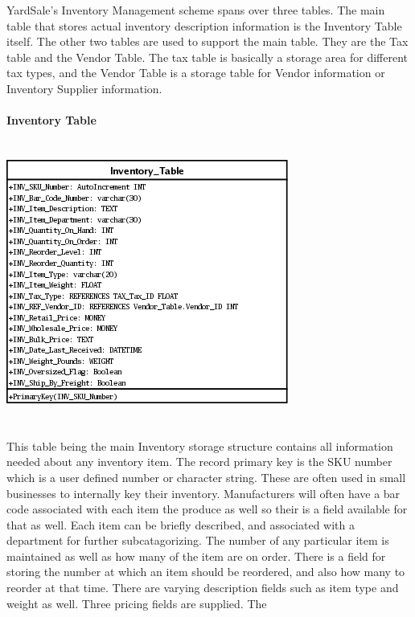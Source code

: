 \documentclass{report}
\begin{document}
        YardSale's Inventory Management scheme spans over three tables. The main table that
        stores actual inventory description information is the Inventory Table itself. The
        other two tables are used to support the main table. They are the Tax table and the
        Vendor Table. The tax table is basically a storage area for different tax types, and
        the Vendor Table is a storage table for Vendor information or Inventory Supplier
        information.\\
        \\
        {\bf Inventory Table}\\
        \\
        \\
        \includegraphics{Tables/InventoryTable.png}\\
        \\
        \\
        This table being the main Inventory storage structure contains all information needed
        about any inventory item. The record primary key is the SKU number which is a user
        defined number or character string. These are often used in small businesses to
        internally key their inventory. Manufacturers will often have a bar code associated
        with each item the produce as well so their is a field available for that as well.
        Each item can be briefly described, and associated with a department for further
        subcatagorizing. The number of any particular item is maintained as well as how many
        of the item are on order. There is a field for storing the number at which an item should
        be reordered, and also how many to reorder at that time. There are varying description
        fields such as item type and weight as well. Three pricing fields are supplied. The
\end{document}

